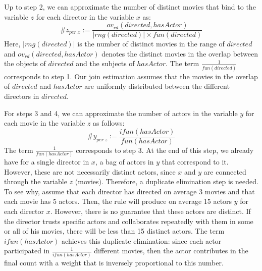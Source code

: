 Up to step 2, we can approximate the number of distinct movies that bind to the variable $z$ for each director in the variable $x$ as:
$$
\#z_{per \; x} := \frac{ ov_{rd}(directed,hasActor) }{|rng(directed)| \times fun(directed)}
$$
Here, $|rng(directed)|$ is the number of distinct movies in the range of $directed$ and $ov_{rd}(directed,hasActor)$ 
denotes the distinct movies in the overlap between the objects of $directed$ and the subjects of $hasActor$.
The term $\frac{1}{fun(directed)}$ corresponds to step  1.
Our join estimation assumes that the movies in the overlap of $directed$ 
and $hasActor$ are uniformly distributed between the different directors in $directed$.

For steps 3 and 4, we can approximate the number of actors in the variable $y$ for each movie in the variable $z$ as follows:
$$
\#y_{ per \; z} := \frac{ifun(hasActor)}{fun(hasActor)}
$$
The term $\frac{1}{fun(hasActor)}$ corresponds to step 3. At the end of this step, 
we already have for a single director in $x$, a bag of actors in $y$ that correspond to it.
However, these are not necessarily distinct actors, since $x$ and $y$ are connected through the variable $z$ (movies). Therefore, a duplicate elimination step is needed.
To see why, assume that each director has directed on average 3 movies and that each movie has 5 actors. Then, the rule will produce on average 15 actors $y$ for each director $x$.
However, there is no guarantee that these actors are distinct.
If the director trusts specific actors and collaborates repeatedly with them in some or all of his movies, there will be less than 15 distinct actors.
The term $ifun(hasActor)$ achieves this duplicate elimination: 
since each actor participated in $\frac{1}{ifun(hasActor)}$ different movies, then the actor
contributes in the final count with a weight that is inversely proportional to this number.


